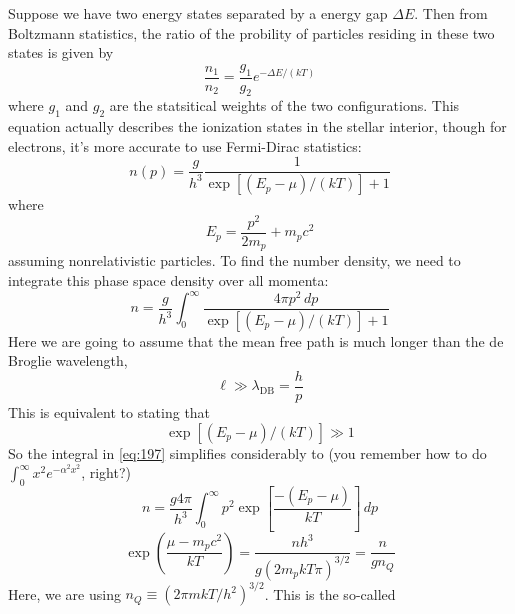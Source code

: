 \documentclass[10pt]{article}
\numberwithin{equation}{section}
\begin{document}
    Suppose we have two energy states separated by a energy gap
    $\Delta E$. Then from Boltzmann statistics, the ratio of the
    probility of particles residing in these two states is given by
    \begin{equation}
      \label{eq:194}
      \frac{n_1}{n_2}=\frac{g_1}{g_2}e^{-\Delta E/(kT)}
    \end{equation}
    where $g_1$ and $g_2$ are the statsitical weights of the two
    configurations. This equation actually describes the ionization
    states in the stellar interior, though for electrons, it's more
    accurate to use Fermi-Dirac statistics:
    \begin{equation}
      \label{eq:195}
      \boxed{n(p)=\frac{g}{h^3}\frac{1}{\exp\left[(E_p-\mu)/(kT)\right]+1}}
    \end{equation}
    where
    \begin{equation}
      \label{eq:196}
      \boxed{E_p=\frac{p^2}{2m_p}+m_pc^2}
    \end{equation}
    assuming nonrelativistic particles. To find the number density, we
    need to integrate this phase space density over all momenta:
    \begin{equation}
      \label{eq:197}
      n=\frac{g}{h^3}\int_0^\infty\frac{4\pi p^2\,dp}{\exp\left[(E_p-\mu)/
(kT)\right]+1}
    \end{equation}
    Here we are going to assume that the mean free path is much longer than
    the de Broglie wavelength,
    \begin{equation}
      \label{eq:198}
      \ell\gg \lambda_{\mathrm{DB}}=\frac{h}{p}
    \end{equation}
    This is equivalent to stating that
    \begin{equation}
      \label{eq:199}
      \exp\left[(E_p-\mu)/(kT)\right]\gg 1
    \end{equation}
    So the integral in \eqref{eq:197} simplifies considerably to (you
    remember how to do $\int_0^\infty x^2 e^{-\alpha^2x^2}$, right?)
    \begin{equation}
      \label{eq:200}
      n=\frac{g 4\pi}{h^3}\int_0^\infty p^2
      \exp\left[\frac{-(E_p-\mu)}{kT}\right] \,dp
    \end{equation}
    \begin{equation}
      \label{eq:201}
      \exp\left(\frac{\mu-m_pc^2}{kT}\right)=\frac{nh^3}{g(2m_pk T\pi)^
{3/2}}=\frac{n}{gn_Q}
    \end{equation}
    Here, we are using $n_Q\equiv (2\pi mkT/h^2)^{3/2}$. This is the so-called
\end{document}
